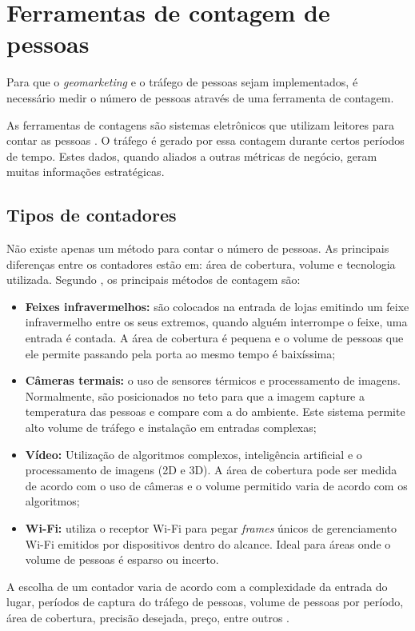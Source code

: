 \section{Ferramentas de contagem de pessoas}
Para que o \emph{geomarketing} e o tráfego de pessoas sejam implementados, é necessário medir o número
de pessoas através de uma ferramenta de contagem.

As ferramentas de contagens são sistemas eletrônicos que utilizam leitores para contar as pessoas
\cite{trafsysdef}. O tráfego é gerado por essa contagem durante
certos períodos de tempo. Estes dados, quando aliados a outras métricas de
negócio, geram muitas informações estratégicas.

\subsection{Tipos de contadores}
Não existe apenas um método para contar o número de pessoas. As principais
diferenças entre os contadores estão em: área de cobertura, volume e tecnologia
utilizada. Segundo , os principais métodos de
contagem são:

\begin{itemize}
  \item \textbf{Feixes infravermelhos:} são colocados
na entrada de lojas emitindo um feixe infravermelho entre os seus extremos,
quando alguém interrompe o feixe, uma entrada é contada. A área de cobertura é
pequena e o volume de pessoas que ele permite passando pela porta ao mesmo
tempo é baixíssima;
  \item \textbf{Câmeras termais:} o uso de sensores térmicos e
processamento de imagens. Normalmente,
são posicionados no teto para que a imagem capture a temperatura das pessoas
e compare com a do ambiente. Este sistema permite alto volume de tráfego e instalação em entradas complexas;
  \item \textbf{Vídeo:} Utilização de algoritmos complexos, inteligência artificial
   e o processamento de imagens (2D e 3D). A área de cobertura
  pode ser medida de acordo com o uso de câmeras e o volume permitido varia de acordo com os algoritmos;
  \item \textbf{Wi-Fi:} utiliza o receptor Wi-Fi para pegar \emph{frames} únicos de gerenciamento Wi-Fi emitidos por dispositivos
  dentro do alcance. Ideal para áreas onde o volume de pessoas é esparso ou incerto.
\end{itemize}

A escolha de um contador varia de acordo com a complexidade da entrada do lugar, períodos de captura do tráfego de pessoas,
volume de pessoas por período, área de cobertura, precisão desejada, preço, entre outros \cite{trafsys} \cite{Axper2017}.

